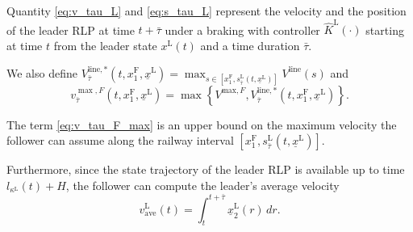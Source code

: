 \documentclass[letterpaper, 10 pt, conference]{ieeeconf}
\theoremstyle{definition}
\theoremstyle{nopoint}
\begin{document}
Quantity \eqref{eq:v_tau_L} and \eqref{eq:s_tau_L} represent the velocity and the position of the leader RLP at time $t+\bar{\tau}$ under a braking with controller $\hat{K}^\mathrm{L}(\cdot)$ starting at time $t$  from the leader state $x^\mathrm{L}(t)$ and a time duration $\bar{\tau}$. 


We also define  $V_{\bar{\tau}}^{\mathrm{line},*}(t,x_1^\mathrm{F},\underline{x}^\mathrm{L})=\max_{s\in \left[x_1^\mathrm{F} ,s_{\bar{\tau}}^\mathrm{L}\left(t,\underline{x}^\mathrm{L}\right)\right]} V^{\mathrm{line}}(s)$
and 
\begin{equation}\label{eq:v_tau_F_max}
v_{\bar{\tau}}^{\max, F}\left( t,x_1^\mathrm{F},\underline{x}^\mathrm{L} \right)=\max\left\{V^{\mathrm{max},F},V_{\bar{\tau}}^{\mathrm{line},*}(t,x_1^\mathrm{F},\underline{x}^\mathrm{L})\right\}.
\end{equation}

The term \eqref{eq:v_tau_F_max} is an upper bound on the maximum velocity the follower can assume along the railway interval $\left[x_1^\mathrm{F} ,s_{\bar{\tau}}^\mathrm{L}\left(t,\underline{x}^\mathrm{L}\right)\right]$.

Furthermore, since the state trajectory of the leader RLP is available up to time $l_{\kappa^\mathrm{L}}(t)+H$, the follower can compute the leader's average velocity
\begin{equation}\label{eq:average_velocity}
v_{\mathrm{ave}}^\mathrm{L}(t)=\int_{t}^{t+\bar{\tau}} \underline{x}_2^\mathrm{L}(r)\, dr.
\end{equation} 
\end{document}
